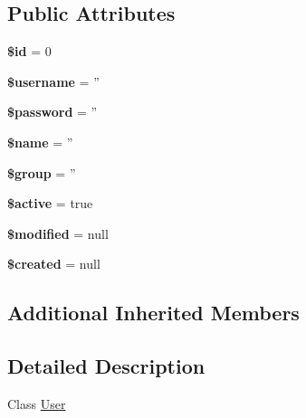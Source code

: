 \subsection*{Public Attributes}
\begin{DoxyCompactItemize}
\item 
\hypertarget{classApp_1_1Db_1_1User_aa8d4bba20dee82a228d4c72ee5279b7a}{{\bfseries \$id} = 0}\label{classApp_1_1Db_1_1User_aa8d4bba20dee82a228d4c72ee5279b7a}

\item 
\hypertarget{classApp_1_1Db_1_1User_a5d98346573de0e017c1c44d9fd69839f}{{\bfseries \$username} = ''}\label{classApp_1_1Db_1_1User_a5d98346573de0e017c1c44d9fd69839f}

\item 
\hypertarget{classApp_1_1Db_1_1User_a5408c5b410c92eeb8080866831ad204f}{{\bfseries \$password} = ''}\label{classApp_1_1Db_1_1User_a5408c5b410c92eeb8080866831ad204f}

\item 
\hypertarget{classApp_1_1Db_1_1User_a92c3d7d19fd5bd8b73f8f4ace0dde275}{{\bfseries \$name} = ''}\label{classApp_1_1Db_1_1User_a92c3d7d19fd5bd8b73f8f4ace0dde275}

\item 
\hypertarget{classApp_1_1Db_1_1User_a902de305ae70bd9dff2091d0b3e9dd98}{{\bfseries \$group} = ''}\label{classApp_1_1Db_1_1User_a902de305ae70bd9dff2091d0b3e9dd98}

\item 
\hypertarget{classApp_1_1Db_1_1User_a6114c09b81a5d2bcc1e0893fc1133ca3}{{\bfseries \$active} = true}\label{classApp_1_1Db_1_1User_a6114c09b81a5d2bcc1e0893fc1133ca3}

\item 
\hypertarget{classApp_1_1Db_1_1User_a3498ed33e1986465284094a9e4116c64}{{\bfseries \$modified} = null}\label{classApp_1_1Db_1_1User_a3498ed33e1986465284094a9e4116c64}

\item 
\hypertarget{classApp_1_1Db_1_1User_afe97a79af8057f539c7fd1b098faee11}{{\bfseries \$created} = null}\label{classApp_1_1Db_1_1User_afe97a79af8057f539c7fd1b098faee11}

\end{DoxyCompactItemize}
\subsection*{Additional Inherited Members}


\subsection{Detailed Description}
Class \hyperlink{classApp_1_1Db_1_1User}{User}


